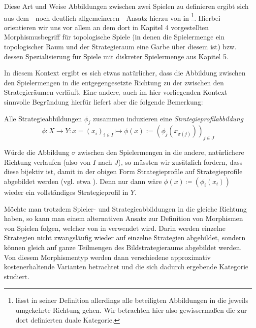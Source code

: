 Diese Art und Weise Abbildungen zwischen zwei Spielen zu definieren ergibt sich aus dem - noch deutlich allgemeineren - Ansatz hierzu von \citeauthor{LapGameCat} in \cite{LapGameCat}\footnote{\citeauthor{LapGameCat} lässt in seiner Definition allerdings alle beteiligten Abbildungen in die jeweils umgekehrte Richtung gehen. Wir betrachten hier also gewissermaßen die zur dort definierten duale Kategorie.}. Hierbei orientieren wir uns vor allem an dem dort in Kapitel 4 vorgestellten Morphismusbegriff für topologische Spiele (in denen die Spielermenge ein topologischer Raum und der Strategieraum eine Garbe über diesem ist) bzw. dessen Spezialisierung für Spiele mit diskreter Spielermenge aus Kapitel 5. 

In diesem Kontext ergibt es sich etwas natürlicher, dass die Abbildung zwischen den Spielermengen in die entgegengesetzte Richtung zu der zwischen den Strategieräumen verläuft. Eine andere, auch im hier vorliegenden Kontext sinnvolle Begründung hierfür liefert aber die folgende Bemerkung:

\begin{bem}
	Alle Strategieabbildungen $\phi_j$ zusammen induzieren eine \emph{Strategieprofilabbildung}
	\[\phi: X \to Y: x=(x_i)_{i\in I} \mapsto \phi(x) := \left(\phi_j(x_{\sigma(j)})\right)_{j \in J} \]
\end{bem}

Würde die Abbildung $\sigma$ zwischen den Spielermengen in die andere, \glqq natürlichere\grqq{} Richtung verlaufen (also von $I$ nach $J$), so müssten wir zusätzlich fordern, dass diese bijektiv ist, damit in der obigen Form Strategieprofile auf Strategieprofile abgebildet werden (vgl. etwa \cite{CatGameTheory}). Denn nur dann wäre $\phi(x) \coloneqq \left(\phi_i(x_i)\right)$ wieder ein vollständiges Strategieprofil in $Y$.

\begin{bem}
	Möchte man trotzdem Spieler- und Strategieabbildungen in die gleiche Richtung haben, so kann man einem alternativen Ansatz zur Definition von Morphismen von Spielen folgen, welcher von \citeauthor{Foundations} in \cite{Foundations} verwendet wird. Darin werden einzelne Strategien nicht zwangsläufig wieder auf einzelne Strategien abgebildet, sondern können gleich auf ganze Teilmengen des Bildstrategieraums abgebildet werden. Von diesem Morphismentyp werden dann verschiedene \glqq approximativ kostenerhaltende\grqq{} Varianten betrachtet und die sich dadurch ergebende Kategorie studiert.
\end{bem}

